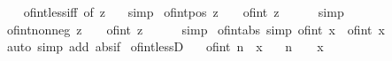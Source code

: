 \begin{isabellebody}
%
\isadelimproof
\ \ %
\endisadelimproof
%
\isatagproof
{}\isamarkupfalse%
\ of{\isacharunderscore}{\kern0pt}int{\isacharunderscore}{\kern0pt}less{\isacharunderscore}{\kern0pt}iff\ {\isacharbrackleft}{\kern0pt}of\ z\ {}{\isacharbrackright}{\kern0pt}\ \isamarkupfalse%
\ simp%
\endisatagproof
{\isafoldproof}%
%
\isadelimproof
\isanewline
%
\endisadelimproof
\isanewline
{}\isamarkupfalse%
\ of{\isacharunderscore}{\kern0pt}int{\isacharunderscore}{\kern0pt}pos{\isacharcolon}{\kern0pt}\ {\isachardoublequoteopen}z\ {\isachargreater}{\kern0pt}\ {}\ {\isasymLongrightarrow}\ of{\isacharunderscore}{\kern0pt}int\ z\ {\isachargreater}{\kern0pt}\ {}{\isachardoublequoteclose}\isanewline
%
\isadelimproof
\ \ %
\endisadelimproof
%
\isatagproof
{}\isamarkupfalse%
\ simp%
\endisatagproof
{\isafoldproof}%
%
\isadelimproof
\isanewline
%
\endisadelimproof
\isanewline
{}\isamarkupfalse%
\ of{\isacharunderscore}{\kern0pt}int{\isacharunderscore}{\kern0pt}nonneg{\isacharcolon}{\kern0pt}\ {\isachardoublequoteopen}z\ {\isasymge}\ {}\ {\isasymLongrightarrow}\ of{\isacharunderscore}{\kern0pt}int\ z\ {\isasymge}\ {}{\isachardoublequoteclose}\isanewline
%
\isadelimproof
\ \ %
\endisadelimproof
%
\isatagproof
{}\isamarkupfalse%
\ simp%
\endisatagproof
{\isafoldproof}%
%
\isadelimproof
\isanewline
%
\endisadelimproof
\isanewline
{}\isamarkupfalse%
\ of{\isacharunderscore}{\kern0pt}int{\isacharunderscore}{\kern0pt}abs\ {\isacharbrackleft}{\kern0pt}simp{\isacharbrackright}{\kern0pt}{\isacharcolon}{\kern0pt}\ {\isachardoublequoteopen}of{\isacharunderscore}{\kern0pt}int\ {\isasymbar}x{\isasymbar}\ {\isacharequal}{\kern0pt}\ {\isasymbar}of{\isacharunderscore}{\kern0pt}int\ x{\isasymbar}{\isachardoublequoteclose}\isanewline
%
\isadelimproof
\ \ %
\endisadelimproof
%
\isatagproof
{}\isamarkupfalse%
\ {\isacharparenleft}{\kern0pt}auto\ simp\ add{\isacharcolon}{\kern0pt}\ abs{\isacharunderscore}{\kern0pt}if{\isacharparenright}{\kern0pt}%
\endisatagproof
{\isafoldproof}%
%
\isadelimproof
\isanewline
%
\endisadelimproof
\isanewline
{}\isamarkupfalse%
\ of{\isacharunderscore}{\kern0pt}int{\isacharunderscore}{\kern0pt}lessD{\isacharcolon}{\kern0pt}\isanewline
\ \ \ {\isachardoublequoteopen}{\isasymbar}of{\isacharunderscore}{\kern0pt}int\ n{\isasymbar}\ {\isacharless}{\kern0pt}\ x{\isachardoublequoteclose}\isanewline
\ \ \ {\isachardoublequoteopen}n\ {\isacharequal}{\kern0pt}\ {}\ {\isasymor}\ x\ {\isachargreater}{\kern0pt}\ {}{\isachardoublequoteclose}\isanewline

\end{isabellebody}
